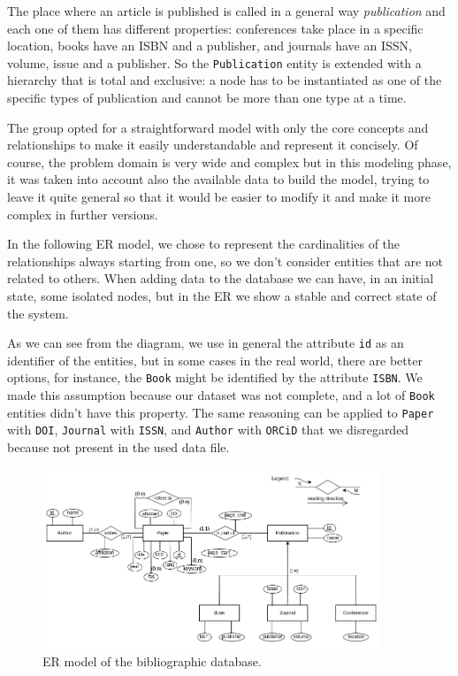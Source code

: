 The place where an article is published is called in a general way \textit{publication} and each one of them has different properties: conferences take place in a specific location, books have an ISBN and a publisher, and journals have an ISSN, volume, issue and a publisher.
So the \verb|Publication| entity is extended with a hierarchy that is total and exclusive: a node has to be instantiated as one of the specific types of publication and cannot be more than one type at a time.

The group opted for a straightforward model with only the core concepts and relationships to make it easily understandable and represent it concisely.
Of course, the problem domain is very wide and complex but in this modeling phase, it was taken into account also the available data to build the model, trying to leave it quite general so that it would be easier to modify it and make it more complex in further versions.

In the following ER model, we chose to represent the cardinalities of the relationships always starting from one, so we don't consider entities that are not related to others.
When adding data to the database we can have, in an initial state, some isolated nodes, but in the ER we show a stable and correct state of the system.

As we can see from the diagram, we use in general the attribute \verb|id| as an identifier of the entities, but in some cases in the real world, there are better options, for instance, the \verb|Book| might be identified by the attribute \verb|ISBN|.
We made this assumption because our dataset was not complete, and a lot of \verb|Book| entities didn't have this property.
The same reasoning can be applied to \verb|Paper| with \verb|DOI|, \verb|Journal| with \verb|ISSN|, and \verb|Author| with \verb|ORCiD| that we disregarded because not present in the used data file.
\begin{figure}[H]
    \begin{center}
        \includegraphics[width=0.9\textwidth]{Images/er}
        \caption{ER model of the bibliographic database.}
        \label{fig:er}%
    \end{center}
\end{figure}

